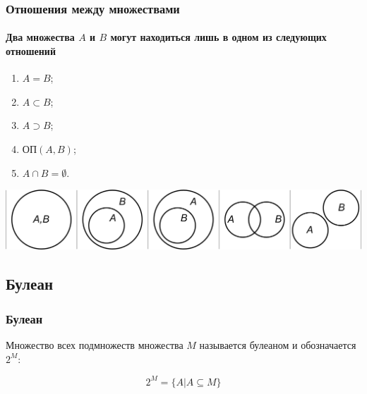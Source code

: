 \begin{frame}
    \frametitle{Отношения между множествами}
    \framesubtitle{Два множества $A$ и $B$ могут находиться лишь в одном из следующих отношений}
    
    \begin{enumerate}
        \item $A=B$;
        \item $A\subset B$;
        \item $A\supset B$;
        \item $\text{ОП}(A,B)$;
        \item $A\cap B = \emptyset$.
    \end{enumerate}
    
    \begin{center}
        \includegraphics[width=\textwidth]{fig/setRelations}
    \end{center}
\end{frame}


\subsection{Булеан}

\begin{frame}
    \frametitle{Булеан}

    \begin{definition}
        Множество всех подмножеств множества $M$ называется \alert{булеаном} и обозначается $2^M$:
        
        \[2^M=\{A|A\subseteq M\}\]
    \end{definition}

    
    
\end{frame}


